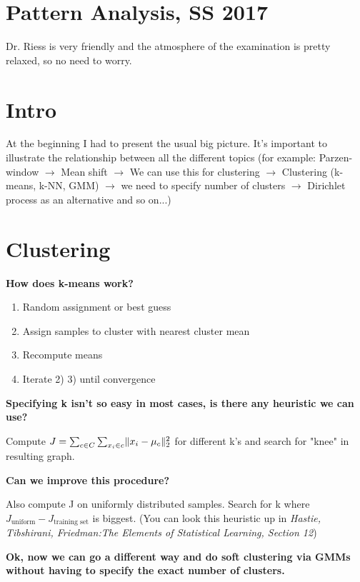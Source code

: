 \documentclass{scrartcl}
\DeclarePairedDelimiter\norm{\lVert}{\rVert}%
\begin{document}
\section*{Pattern Analysis, SS 2017}

Dr. Riess is very friendly and the atmosphere of the examination is pretty relaxed, so no need to worry.

\section{Intro}
At the beginning I had to present the usual big picture. It's important to illustrate the relationship between all the different topics (for example: Parzen-window \(\rightarrow\) Mean shift \(\rightarrow\) We can use this for clustering \(\rightarrow\) Clustering (k-means, k-NN, GMM) \(\rightarrow\) we need to specify number of clusters \(\rightarrow\) Dirichlet process as an alternative and so on...)

\section{Clustering}

\textbf{How does k-means work?}

\begin{enumerate}
    \item
        Random assignment or best guess
    \item
        Assign samples to cluster with nearest cluster mean
    \item
        Recompute means
    \item
        Iterate 2) 3) until convergence
\end{enumerate}


\textbf{Specifying k isn't so easy in most cases, is there any heuristic we can use?}

Compute \(J = \sum_{c \in C} \sum_{x_i \in c} \norm{x_i - \mu_c}_2^2\) for different k's and search for "knee" in resulting graph.


\textbf{Can we improve this procedure?}

Also compute J on uniformly distributed samples. Search for k where \(J_{\text{uniform}} - J_{\text{training set}}\) is biggest. (You can look this heuristic up in \textit{Hastie, Tibshirani, Friedman:The Elements of Statistical Learning, Section 12})

\textbf{Ok, now we can go a different way and do soft clustering via GMMs without having to specify the exact number of clusters.}
\end{document}
